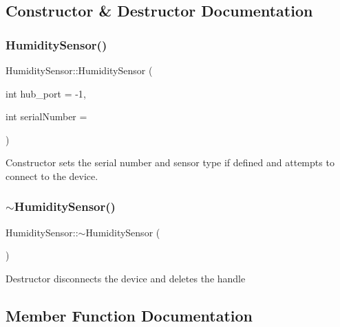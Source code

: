 \subsection{Constructor \& Destructor Documentation}
\mbox{\label{classHumiditySensor_a5e199091caca19235543cd9e55493566}} 
\subsubsection{\texorpdfstring{Humidity\+Sensor()}{HumiditySensor()}}
{\footnotesize\ttfamily Humidity\+Sensor\+::\+Humidity\+Sensor (\begin{DoxyParamCaption}\item[{int}]{hub\+\_\+port = {\ttfamily -\/1},  }\item[{int}]{serial\+Number = {} }\end{DoxyParamCaption})\hspace{0.3cm}{\ttfamily [inline]}}

Constructor sets the serial number and sensor type if defined and attempts to connect to the device.\mbox{\label{classHumiditySensor_a7c176f946d95e90b4f9aabbdbbd90874}} 
\subsubsection{\texorpdfstring{$\sim$\+Humidity\+Sensor()}{~HumiditySensor()}}
{\footnotesize\ttfamily Humidity\+Sensor\+::$\sim$\+Humidity\+Sensor (\begin{DoxyParamCaption}{ }\end{DoxyParamCaption})\hspace{0.3cm}{\ttfamily [inline]}}

Destructor disconnects the device and deletes the handle

\subsection{Member Function Documentation}
\mbox{\label{classHumiditySensor_a5ac9e8fc8d6fc1e78463ce8a7ceae54e}} 
